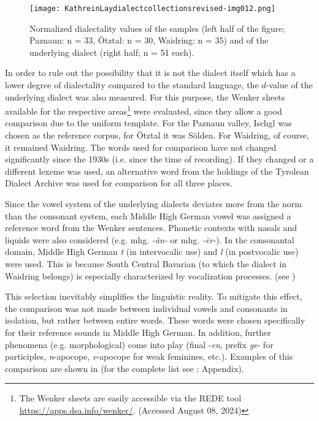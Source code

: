 \documentclass[output=paper]{langscibook}
\begin{document}
\begin{figure}
\texttt{[image: KathreinLaydialectcollectionsrevised-img012.png]}
\caption{\label{fig:kathrein:12} Normalized dialectality values of the samples (left half of the figure; Paznaun: n = 33, Ötztal: n = 30, Waidring: n = 35) and of the underlying dialect (right half; n = 51 each).} 
\end{figure}

In order to rule out the possibility that it is not the dialect itself which has a lower degree of dialectality compared to the standard language, the $d$-value of the underlying dialect was also measured. For this purpose, the Wenker sheets available for the respective areas\footnote{The Wenker sheets are easily accessible via the REDE tool \url{https://apps.dsa.info/wenker/}. (Accessed August 08, 2024)} were evaluated, since they allow a good comparison due to the uniform template. For the Paznaun valley, Ischgl was chosen as the reference corpus, for Ötztal it was Sölden. For Waidring, of course, it remained Waidring. The words used for comparison have not changed significantly since the 1930s (i.e. since the time of recording). If they changed or a different lexeme was used, an alternative word from the holdings of the Tyrolean Dialect Archive was used for comparison for all three places.

Since the vowel system of the underlying dialects deviates more from the norm than the consonant system, each Middle High German vowel was assigned a reference word from the Wenker sentences. Phonetic contexts with nasals and liquids were also considered (e.g. mhg. \textit{{}-ân-} or mhg. \textit{{}-ër-}). In the consonantal domain, Middle High German \textit{t} (in intervocalic use) and \textit{l} (in postvocalic use) were used. This is because South Central Bavarian (to which the dialect in Waidring belongs) is especially characterized by vocalization processes. (see )

This selection inevitably simplifies the linguistic reality. To mitigate this effect, the comparison was not made between individual vowels and consonants in isolation, but rather between entire words. These words were chosen specifically for their reference sounds in Middle High German. In addition, further phenomena (e.g. morphological) come into play (final -\textit{en}, prefix \textit{ge}{}- for participles, \textit{n}{}-apocope, \textit{e}{}-apocope for weak feminines, etc.). Examples of this comparison are shown in  (for the complete list see : Appendix).
\end{document}
